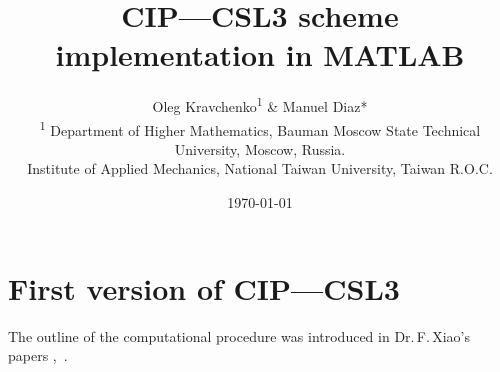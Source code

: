 \documentclass[10pt,a4paper]{article}
\begin{document}
\title{CIP---CSL3 scheme implementation in MATLAB}
\author{Oleg Kravchenko\textsuperscript{1} \& Manuel Diaz* \\
\small \textsuperscript{1} Department of Higher Mathematics, Bauman Moscow State Technical University, Moscow, Russia. \\[-3mm]
\small * Institute of Applied Mechanics, National Taiwan University, Taiwan R.O.C.}
\date{\today}

\maketitle

\linenumbers


\section{First version of CIP---CSL3}

%
%
%
%

The outline of the computational procedure was introduced in Dr.\,F.\,Xiao's papers \cite{Xiao2001},~\cite{Xiao2003}.
\end{document}
